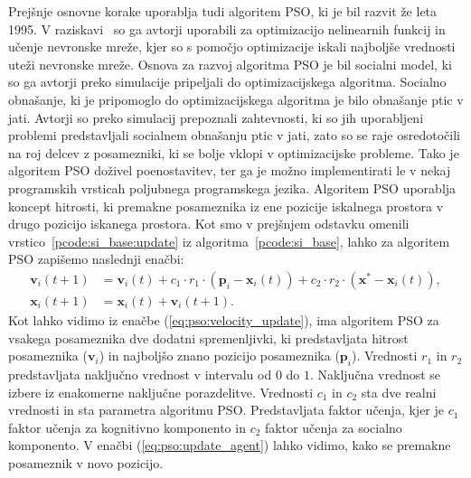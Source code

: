 Prejšnje osnovne korake uporablja tudi algoritem PSO, ki je bil razvit že leta 1995.
V raziskavi~\cite{alg:pso} so ga avtorji uporabili za optimizacijo nelinearnih funkcij in učenje nevronske mreže, kjer so s pomočjo optimizacije iskali najboljše vrednosti uteži nevronske mreže.
Osnova za razvoj algoritma PSO je bil socialni model, ki so ga avtorji preko simulacije pripeljali do optimizacijskega algoritma.
Socialno obnašanje, ki je pripomoglo do optimizacijskega algoritma je bilo obnašanje ptic v jati.
Avtorji so preko simulacij prepoznali zahtevnosti, ki so jih uporabljeni problemi predstavljali socialnem obnašanju ptic v jati, zato so se raje osredotočili na roj delcev z posamezniki, ki se bolje vklopi v optimizacijske probleme.
Tako je algoritem PSO doživel poenostavitev, ter ga je možno implementirati le v nekaj programskih vrsticah poljubnega programskega jezika.
Algoritem PSO uporablja koncept hitrosti, ki premakne posameznika iz ene pozicije iskalnega prostora v drugo pozicijo iskanega prostora.
Kot smo v prejšnjem odstavku omenili vrstico~\ref{pcode:si_base:update} iz algoritma~\ref{pcode:si_base}, lahko za algoritem PSO zapišemo naslednji enačbi:
\begin{align}
    \mathbf{v}_i(t + 1) &= \mathbf{v}_i(t) + c_1 \cdot r_1 \cdot (\mathbf{p}_i - \mathbf{x}_i(t)) + c_2 \cdot r_2 \cdot (\mathbf{x}^* - \mathbf{x}_i(t)),\label{eq:pso:velocity_update} \\
	\mathbf{x}_i(t + 1) &= \mathbf{x}_i(t) + \mathbf{v}_i(t + 1). \label{eq:pso:update_agent}
\end{align}
Kot lahko vidimo iz enačbe (\ref{eq:pso:velocity_update}), ima algoritem PSO za vsakega posameznika dve dodatni spremenljivki, ki predstavljata hitrost posameznika ($\mathbf{v}_i$) in najboljšo znano pozicijo posameznika ($\mathbf{p}_i$).
Vrednosti $r_1$ in $r_2$ predstavljata naključno vrednost v intervalu od $0$ do $1$.
Naključna vrednost se izbere iz enakomerne naključne porazdelitve.
Vrednosti $c_1$ in $c_2$ sta dve realni vrednosti in sta parametra algoritmu PSO.
Predstavljata faktor učenja, kjer je $c_1$ faktor učenja za kognitivno komponento in $c_2$ faktor učenja za socialno komponento.
V enačbi (\ref{eq:pso:update_agent}) lahko vidimo, kako se premakne posameznik v novo pozicijo.


